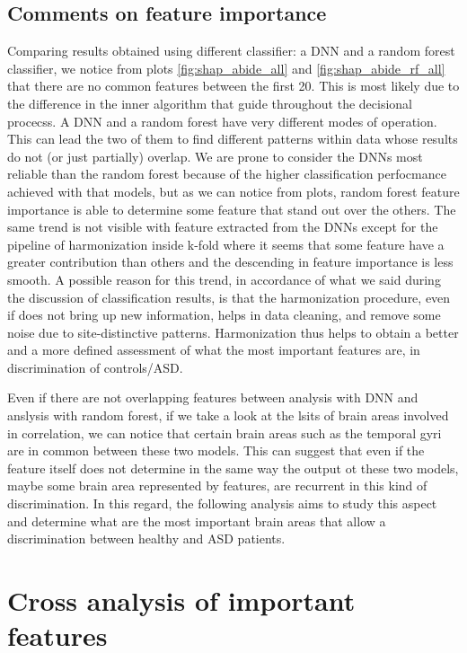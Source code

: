 \documentclass[11pt]{report}
\begin{document}
\subsection*{Comments on feature importance}
Comparing results obtained using different classifier: a DNN and a random forest classifier, we notice from plots \ref{fig:shap_abide_all} and \ref{fig:shap_abide_rf_all} that there are no common features between the first 20. This is most likely due to the difference in the inner algorithm that guide throughout the decisional procecss. A DNN and a random forest have very different modes of operation. This can lead the two of them to find different patterns within data whose results do not (or just partially) overlap.
We are prone to consider the DNNs most reliable than the random forest because of the higher classification perfocmance achieved with that models, but as we can notice from plots, random forest feature importance is able to determine some feature that stand out over the others.
The same trend is not visible with feature extracted from the DNNs except for the pipeline of harmonization inside k-fold where it seems that some feature have a greater contribution than others and the descending in feature importance is less smooth.
A possible reason for this trend, in accordance of what we said during the discussion of classification results, is that the harmonization procedure, even if does not bring up new information, helps in data cleaning, and remove some noise due to site-distinctive patterns.
Harmonization thus helps to obtain a better and a more defined assessment of what the most important features are, in discrimination of controls/ASD.

Even if there are not overlapping features between analysis with DNN and anslysis with random forest, if we take a look at the lsits of brain areas involved in correlation, we can notice that certain brain areas such as the temporal gyri are in common between these two models.
This can suggest that even if the feature itself does not determine in the same way the output ot these two models, maybe some brain area represented by features, are recurrent in this kind of discrimination.
In this regard, the following analysis aims to study this aspect and determine what are the most important brain areas that allow a discrimination between healthy and ASD patients.

\newpage
\section{Cross analysis of important features}\label{sec:feature_importance_5}
\end{document}
